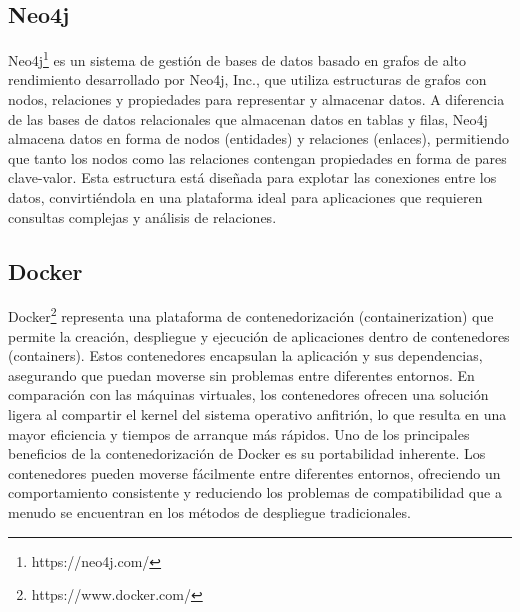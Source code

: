 \subsection{Neo4j}

Neo4j\footnote{https://neo4j.com/} es un sistema de gestión de bases de datos basado en grafos de alto rendimiento desarrollado por 
Neo4j, Inc., 
que utiliza estructuras de grafos con nodos, relaciones y propiedades para representar y almacenar datos. A 
diferencia de las bases de datos relacionales que almacenan datos en tablas y filas, Neo4j almacena datos en 
forma de nodos (entidades) y relaciones (enlaces), permitiendo que tanto los nodos como las relaciones contengan 
propiedades en forma de pares clave-valor. Esta estructura está diseñada para explotar las conexiones entre 
los datos, convirtiéndola en una plataforma ideal para aplicaciones que requieren consultas complejas y 
análisis de relaciones. 

\subsection{Docker}

Docker\footnote{https://www.docker.com/} representa una plataforma de contenedorización (containerization) que permite la creación, despliegue y ejecución de aplicaciones 
dentro de contenedores (containers). Estos contenedores encapsulan la aplicación y sus dependencias, asegurando que puedan moverse 
sin problemas entre diferentes entornos. En comparación con las máquinas virtuales, los contenedores ofrecen una 
solución ligera al compartir el kernel del sistema operativo anfitrión, lo que resulta en una mayor eficiencia y 
tiempos de arranque más rápidos. Uno de los principales beneficios de la contenedorización de Docker es su portabilidad 
inherente. Los contenedores pueden moverse fácilmente entre diferentes entornos, ofreciendo un comportamiento 
consistente y reduciendo los problemas de compatibilidad que a menudo se encuentran en los métodos de despliegue 
tradicionales.